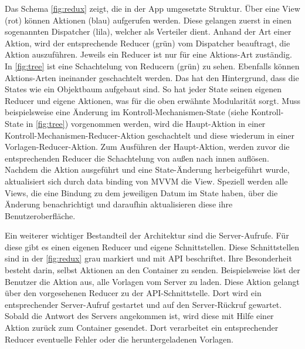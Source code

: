 \documentclass[notables, nomenclature, oneside, 150]{HSMW-Thesis}
\begin{document}
		Das Schema \ref{fig:redux} zeigt, die in der App umgesetzte Struktur. Über eine View (rot) können Aktionen (blau) aufgerufen werden. Diese gelangen zuerst in einen sogenannten Dispatcher (lila), welcher als Verteiler dient. Anhand der Art einer Aktion, wird der entsprechende Reducer (grün) vom Dispatcher beauftragt, die Aktion auszuführen. Jeweils ein Reducer ist nur für eine Aktions-Art zuständig. In \autoref{fig:tree} ist eine Schachtelung von Reducern (grün) zu sehen. Ebenfalls können Aktions-Arten ineinander geschachtelt werden. Das hat den Hintergrund, dass die States wie ein Objektbaum aufgebaut sind. So hat jeder State seinen eigenen Reducer und eigene Aktionen, was für die oben erwähnte Modularität sorgt. Muss beispielsweise eine Änderung im Kontroll-Mechanismen-State (siehe Kontroll-State in \ref{fig:tree}) vorgenommen werden, wird die Haupt-Aktion in einer Kontroll-Mechanismen-Reducer-Aktion geschachtelt und diese wiederum in einer Vorlagen-Reducer-Aktion. Zum Ausführen der Haupt-Aktion, werden zuvor die entsprechenden Reducer die Schachtelung von außen nach innen auflösen. Nachdem die Aktion ausgeführt und eine State-Änderung herbeigeführt wurde, aktualisiert sich durch data binding von MVVM die View. Speziell werden alle Views, die eine Bindung zu dem jeweiligen Datum im State haben, über die Änderung benachrichtigt und daraufhin aktualisieren diese ihre Benutzeroberfläche.

		Ein weiterer wichtiger Bestandteil der Architektur sind die Server-Aufrufe. Für diese gibt es einen eigenen Reducer und eigene Schnittstellen. Diese Schnittstellen sind in der \autoref{fig:redux} grau markiert und mit API  beschriftet. Ihre Besonderheit besteht darin, selbst Aktionen an den Container zu senden. Beispielsweise löst der Benutzer die Aktion aus, alle Vorlagen vom Server zu laden. Diese Aktion gelangt über den vorgesehenen Reducer zu der API-Schnittstelle. Dort wird ein entsprechender Server-Aufruf gestartet und auf den Server-Rückruf gewartet. Sobald die Antwort des Servers angekommen ist, wird diese mit Hilfe einer Aktion zurück zum Container gesendet. Dort verarbeitet ein entsprechender Reducer eventuelle Fehler oder die heruntergeladenen Vorlagen.
		
\end{document}
